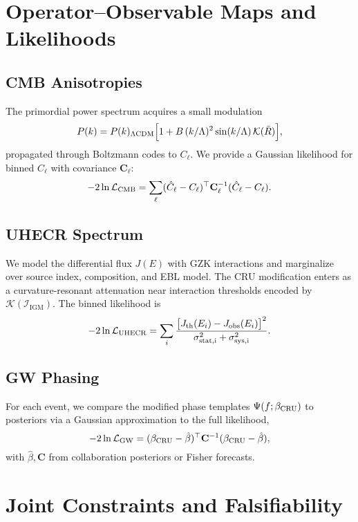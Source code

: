 \documentclass[12pt,a4paper,oneside]{scrbook}
\theoremstyle{definition}
\theoremstyle{remark}
\newcommand{\Cl}{C_\ell}
\newcommand{\Pk}{P(k)}
\newcommand{\K}{\mathcal{K}}
\begin{document}
\chapter{Operator–Observable Maps and Likelihoods}
\label{chap:likelihoods}
\section{CMB Anisotropies}
\label{sec:CMB}
The primordial power spectrum acquires a small modulation
\begin{equation}
\Pk = \Pk_{\Lambda{\rm CDM}}\Big[1 + B\,(k/\Lambda)^2 \sin(k/\Lambda)\,\K(\bar R)\Big],
\label{eq:PkCRU}
\end{equation}
propagated through Boltzmann codes to $\Cl$. We provide a Gaussian likelihood for binned $\Cl$ with covariance $\mathbf{C}_\ell$:
\begin{equation}
-2\ln\mathcal{L}_{\rm CMB} = \sum_{\ell} (\hat C_\ell - C_\ell)^\top \mathbf{C}_\ell^{-1} (\hat C_\ell - C_\ell).
\end{equation}
\section{UHECR Spectrum}
\label{sec:UHECR}
We model the differential flux $J(E)$ with GZK interactions and marginalize over source index, composition, and EBL model. The CRU modification enters as a curvature-resonant attenuation near interaction thresholds encoded by $\K(\mathcal{I}_\mathrm{IGM})$. The binned likelihood is
\begin{equation}
-2\ln\mathcal{L}_{\rm UHECR}= \sum_i \frac{\big[J_{\rm th}(E_i)-J_{\rm obs}(E_i)\big]^2}{\sigma_{\rm stat,i}^2+\sigma_{\rm sys,i}^2}.
\end{equation}
\section{GW Phasing}
\label{sec:GWlike}
For each event, we compare the modified phase templates $\Psi(f;\beta_{\rm CRU})$ to posteriors via a Gaussian approximation to the full likelihood,
\begin{equation}
-2\ln\mathcal{L}_{\rm GW}= (\beta_{\rm CRU}-\hat\beta)^\top \mathbf{C}^{-1} (\beta_{\rm CRU}-\hat\beta),
\end{equation}
with $\hat\beta,\mathbf{C}$ from collaboration posteriors or Fisher forecasts.
\chapter{Joint Constraints and Falsifiability}
\label{chap:fals}
\end{document}

